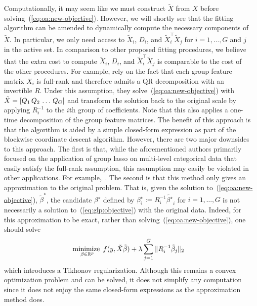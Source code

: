 Computationally, it may seem like 
we must construct $\tilde{X}$ from $X$ before solving~(\ref{eq:oa:new-objective}).
However, we will shortly see that the fitting algorithm can be amended to 
dynamically compute the necessary components of $\tilde{X}$.
In particular, we only need access to $\tilde{X}_i$, $D_i$,
and $\tilde{X}_i^\top \tilde{X}_j$ for $i=1,\ldots,G$ and $j$ in the active set.
In comparison to other proposed fitting procedures,
we believe that the extra cost to compute $\tilde{X}_i$, $D_i$, and $\tilde{X}_i^\top \tilde{X}_j$
is comparable to the cost of the other procedures.
For example, \citet{yuan:2006,meier:2008} rely on the fact that
each group feature matrix $X_i$ is full-rank and therefore admits a QR decomposition with an invertible $R$.
Under this assumption, they solve~(\ref{eq:oa:new-objective}) with $\tilde{X} = \left[Q_1 \, Q_2 \, \ldots \, Q_G\right]$
and transform the solution back to the original scale by applying $R_i^{-1}$ to the $i$th group of coefficients.
Note that this also applies a one-time decomposition of the group feature matrices.
The benefit of this approach is that the algorithm is aided by a simple closed-form expression
as part of the blockwise coordinate descent algorithm.
However, there are two major downsides to this approach.
The first is that, while the aforementioned authors primarily focused on the application of group lasso 
on multi-level categorical data that easily satisfy the full-rank assumption,
this assumption may easily be violated in other applications.
For example,~.
The second is that this method only gives an approximation to the original problem.
That is, given the solution to~(\ref{eq:oa:new-objective}), $\tilde{\beta}^*$,
the candidate $\beta^\star$ defined by $\beta^\star_i := R_i^{-1} \tilde{\beta^\star}_i$ 
for $i=1,\ldots, G$ is not necessarily a solution to~(\ref{eq:glp:objective})
with the original data.
Indeed, for this approximation to be exact, 
rather than solving~(\ref{eq:oa:new-objective}),
one should solve
\begin{align*}
    \operatorname*{minimize\;}_{\beta \in \mathbb{R}^p}
    f(y, \tilde{X} \tilde{\beta})
    + \lambda \sum\limits_{j=1}^G \|R_i^{-1} \tilde{\beta}_j\|_2
\end{align*}
which introduces a Tikhonov regularization.
Although this remains a convex optimization problem and can be solved,
it does not simplify any computation since it does not enjoy the same 
closed-form expressions as the approximation method does.

